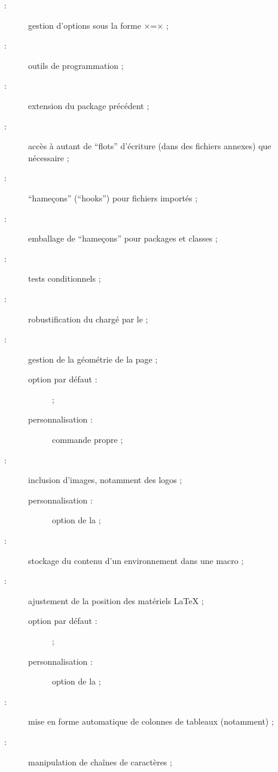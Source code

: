 \begin{description}
\item[ :] gestion d'options sous la forme
  ×=× ;
\item[ :] outils de programmation ;
\item[ :] extension du package précédent ;
\item[ :] accès à autant de \enquote{flots} d'écriture
  (dans des fichiers annexes) que nécessaire ;
\item[ :] \enquote{hameçons} (\foreignquote{english}{hooks})
  pour fichiers importés ;
\item[ :] emballage de \enquote{hameçons} pour packages et
  classes ;
\item[ :] tests conditionnels ;
\item[ :] robustification du  chargé par le
   ;
\item[ :] gestion de la géométrie de la page ;
  \begin{description}
  \item[option par défaut :]  ;
  \item[personnalisation :] commande propre  ;
  \end{description}
\item[ :] inclusion d'images, notamment des logos ;
  \begin{description}
  \item[personnalisation :] option de la \yatcl {} ;
  \end{description}
\item[ :] stockage du contenu d'un environnement dans une
  macro ;
\item[ :] ajustement de la position des matériels
  \LaTeX{} ;
  \begin{description}
  \item[option par défaut :]  ;
  \item[personnalisation :] option de la \yatcl {} ;
  \end{description}
\item[ :] mise en forme automatique de colonnes de tableaux
  (notamment) ;
\item[ :] manipulation de chaînes de caractères ;

\end{description}

